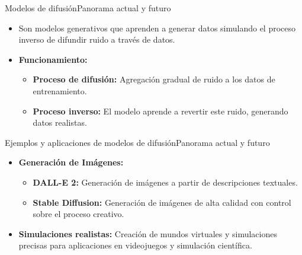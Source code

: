 \documentclass[10pt,border=3pt,tikz]{beamer}
\begin{document}
    \begin{frame}{Modelos de difusión}{Panorama actual y futuro}
        \begin{itemize}
            \item Son modelos generativos que aprenden a generar datos simulando el proceso inverso de difundir ruido a través de datos.
            \item \textbf{Funcionamiento:}
            \begin{itemize}
                \item \textbf{Proceso de difusión:} Agregación gradual de ruido a los datos de entrenamiento.
                \item \textbf{Proceso inverso:} El modelo aprende a revertir este ruido, generando datos realistas.
            \end{itemize}
        \end{itemize}
    \end{frame}
    
    \begin{frame}{Ejemplos y aplicaciones de modelos de difusión}{Panorama actual y futuro}
        \begin{itemize}
            \item \textbf{Generación de Imágenes:}
            \begin{itemize}
                \item \textbf{DALL-E 2:} Generación de imágenes a partir de descripciones textuales.
                \item \textbf{Stable Diffusion:} Generación de imágenes de alta calidad con control sobre el proceso creativo.
            \end{itemize}
            \item \textbf{Simulaciones realistas:} Creación de mundos virtuales y simulaciones precisas para aplicaciones en videojuegos y simulación científica.
        \end{itemize}
    \end{frame}
    
\end{document}
